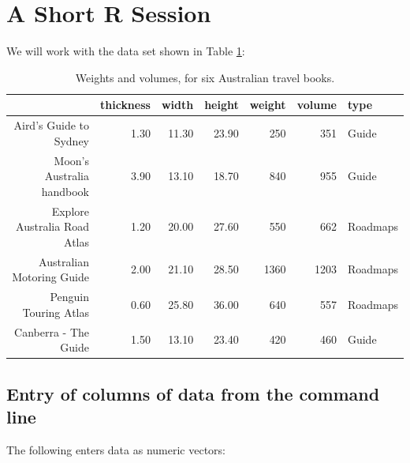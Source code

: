 \section{A Short R Session}\label{ss:shortR}
We will work with the data set shown in Table
\ref{tab:travel}:

\begin{table}[ht]
\centering
\begin{tabular}{rrrrrrl}
  \hline
 & thickness & width & height & weight & volume & type \\
  \hline
Aird's Guide to Sydney & 1.30 & 11.30 & 23.90 & 250 & 351 & Guide \\
  Moon's Australia handbook & 3.90 & 13.10 & 18.70 & 840 & 955 & Guide \\
  Explore Australia Road Atlas & 1.20 & 20.00 & 27.60 & 550 & 662 & Roadmaps \\
  Australian Motoring Guide & 2.00 & 21.10 & 28.50 & 1360 & 1203 & Roadmaps \\
  Penguin Touring Atlas & 0.60 & 25.80 & 36.00 & 640 & 557 & Roadmaps \\
  Canberra - The Guide & 1.50 & 13.10 & 23.40 & 420 & 460 & Guide \\
   \hline
\end{tabular}
\vspace*{15pt}

\caption{Weights and volumes, for six Australian travel
books.}\label{tab:travel}
\end{table}

\subsection*{Entry of columns of data from the command line}
The following enters data as numeric vectors:
\begin{knitrout}
\color{fgcolor}\begin{kframe}
\begin{alltt}
 \hlkwb{<-} \hlstd{(}\hlstd{,} \hlstd{,} \hlstd{,} \hlstd{,} \hlstd{,} \hlstd{)}
 \hlkwb{<-} \hlstd{(}\hlstd{,} \hlstd{,} \hlstd{,} \hlstd{,} \hlstd{,} \hlstd{)}
\end{alltt}
\end{kframe}
\end{knitrout}

